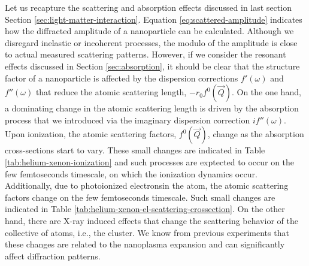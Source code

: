  Let us recapture the scattering and absorption effects discussed in last section Section \ref{sec:light-matter-interaction}. Equation \eqref{eq:scattered-amplitude} indicates how the diffracted amplitude of a nanoparticle can be calculated. Although we disregard inelastic or incoherent processes, the modulo of the amplitude is close to actual measured scattering patterns. However, if we consider the resonant effects discussed in Section \ref{sec:absorption}, it should be clear that the structure factor of a nanoparticle is affected by the dispersion corrections $f'\left(\omega\right)$ and $f''\left(\omega\right)$ that reduce the atomic scattering length, $-r_{0}f^{0}\left(\vec{Q}\right)$. On the one hand, a dominating change in the atomic scattering length is driven by the absorption process that we introduced via the imaginary dispersion correction $i f''\left(\omega\right)$. Upon ionization, the atomic scattering factors, $f^{0}\left(\vec{Q}\right)$, change as the absorption cross-sections start to vary. These small changes are indicated in Table \ref{tab:helium-xenon-ionization} and such processes are exptected to occur on the few femtoseconds timescale, on which the ionization dynamics occur. Additionally, due to photoionized electronsin the atom, the atomic scattering factors change on the few femtoseconds timescale. Such small changes are indicated in Table \ref{tab:helium-xenon-el-scattering-crossection}. On the other hand, there are X-ray induced effects that change the scattering behavior of the collective of atoms, i.e., the cluster. We know from previous experiments \citep{Gorkhover-2016-NatPho} that these changes are related to the nanoplasma expansion and can significantly affect diffraction patterns.\\[1\baselineskip]
%
